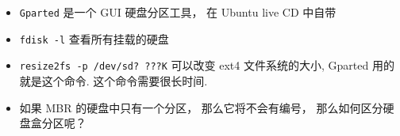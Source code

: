 
\begin{issues}
\issueDraft
\end{issues}

\begin{itemize}
\item \verb|Gparted| 是一个 GUI 硬盘分区工具， 在 Ubuntu live CD 中自带
\item \verb|fdisk -l| 查看所有挂载的硬盘
\item \verb|resize2fs -p /dev/sd? ???K| 可以改变 ext4 文件系统的大小, Gparted 用的就是这个命令. 这个命令需要很长时间.
\item 如果 MBR 的硬盘中只有一个分区， 那么它将不会有编号， 那么如何区分硬盘盒分区呢？
\end{itemize}
